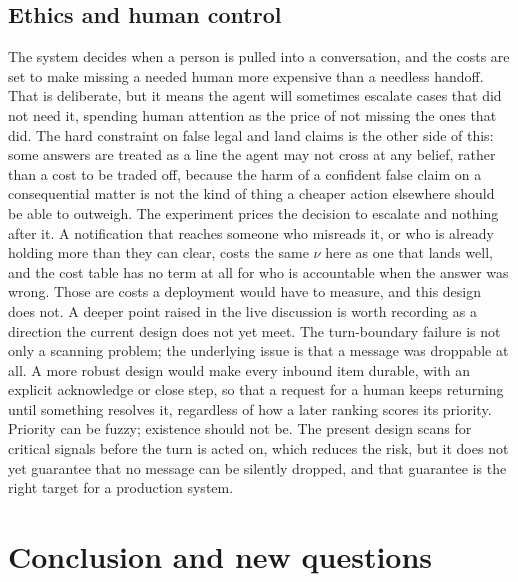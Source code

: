 \documentclass{article}
\begin{document}
\subsection{Ethics and human control}
The system decides when a person is pulled into a conversation, and the costs are
set to make missing a needed human more expensive than a needless handoff. That is
deliberate, but it means the agent will sometimes escalate cases that did not need
it, spending human attention as the price of not missing the ones that did. The
hard constraint on false legal and land claims is the other side of this: some
answers are treated as a line the agent may not cross at any belief, rather than a
cost to be traded off, because the harm of a confident false claim on a
consequential matter is not the kind of thing a cheaper action elsewhere should be
able to outweigh.
The experiment prices the decision to escalate and nothing after it. A notification
that reaches someone who misreads it, or who is already holding more than they can
clear, costs the same $\nu$ here as one that lands well, and the cost table has no
term at all for who is accountable when the answer was wrong. Those are costs a
deployment would have to measure, and this design does not.
A deeper point raised in the live discussion is worth recording as a direction the
current design does not yet meet. The turn-boundary failure is not only a scanning
problem; the underlying issue is that a message was droppable at all. A more robust
design would make every inbound item durable, with an explicit acknowledge or
close step, so that a request for a human keeps returning until something resolves
it, regardless of how a later ranking scores its priority. Priority can be fuzzy;
existence should not be. The present design scans for critical signals before the
turn is acted on, which reduces the risk, but it does not yet guarantee that no
message can be silently dropped, and that guarantee is the right target for a
production system.

\section{Conclusion and new questions}
\label{sec:conclusion}
\end{document}
